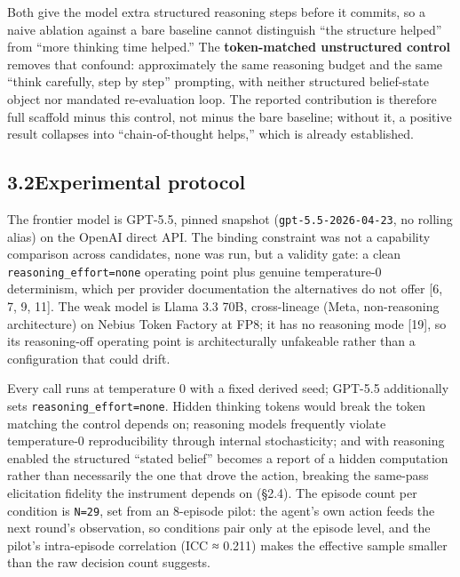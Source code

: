 \documentclass[
  10pt,
]{article}
\newcounter{none} %
\begin{document}
Both give the model extra structured reasoning steps before it commits, so a naive ablation against a bare baseline cannot distinguish ``the structure helped'' from ``more thinking time helped.'' The \textbf{token-matched unstructured control} removes that confound: approximately the same reasoning budget and the same ``think carefully, step by step'' prompting, with neither structured belief-state object nor mandated re-evaluation loop. The reported contribution is therefore full scaffold minus this control, not minus the bare baseline; without it, a positive result collapses into ``chain-of-thought helps,'' which is already established.

\subsection{3.2\quad Experimental protocol}\label{experimental-protocol}

The frontier model is GPT-5.5, pinned snapshot (\texttt{gpt-5.5-2026-04-23}, no rolling alias) on the OpenAI direct API. The binding constraint was not a capability comparison across candidates, none was run, but a validity gate: a clean \texttt{reasoning\_effort=\textquotesingle{}none\textquotesingle{}} operating point plus genuine temperature-0 determinism, which per provider documentation the alternatives do not offer {[}6, 7, 9, 11{]}. The weak model is Llama 3.3 70B, cross-lineage (Meta, non-reasoning architecture) on Nebius Token Factory at FP8; it has no reasoning mode {[}19{]}, so its reasoning-off operating point is architecturally unfakeable rather than a configuration that could drift.

Every call runs at temperature 0 with a fixed derived seed; GPT-5.5 additionally sets \texttt{reasoning\_effort=\textquotesingle{}none\textquotesingle{}}. Hidden thinking tokens would break the token matching the control depends on; reasoning models frequently violate temperature-0 reproducibility through internal stochasticity; and with reasoning enabled the structured ``stated belief'' becomes a report of a hidden computation rather than necessarily the one that drove the action, breaking the same-pass elicitation fidelity the instrument depends on (§2.4). The episode count per condition is \texttt{N=29}, set from an 8-episode pilot: the agent's own action feeds the next round's observation, so conditions pair only at the episode level, and the pilot's intra-episode correlation (ICC ≈ 0.211) makes the effective sample smaller than the raw decision count suggests.
\end{document}
